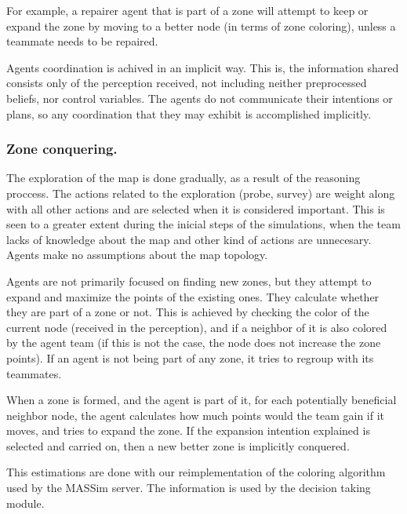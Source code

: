 \documentclass{llncs2e/llncs}
\begin{document}
    For example, a repairer agent that is part of a zone will attempt to keep or
    expand the zone by moving to a better node (in terms of zone coloring), 
    unless a teammate needs to be repaired.
    
    Agents coordination is achived in an implicit way. This is, the information
    shared consists only of the perception received, not including neither 
    preprocessed beliefs, nor control variables. The agents do not communicate
    their intentions or plans, so any coordination that they may exhibit is 
    accomplished implicitly.
       
\subsubsection{Zone conquering.}
    
    The exploration of the map is done gradually, as a result of the reasoning 
    proccess. The actions related to the exploration (probe, survey) are weight 
    along with all other actions and are selected when it is considered important. 
    This is seen to a greater extent during the inicial steps of the simulations, 
    when the team lacks of knowledge about the map and other kind of actions are 
    unnecesary. Agents make no assumptions about the map topology.

    Agents are not primarily focused on finding new zones, but they attempt to 
    expand and maximize the points of the existing ones.    
    They calculate whether they are part of a zone or not. This is achieved
    by checking the color of the current node (received in the perception), and if
    a neighbor of it is also colored by the agent team (if this is not the case, the 
    node does not increase the zone points).
    If an agent is not being part of any zone, it tries to regroup with its 
    teammates. 

    When a zone is formed, and the agent is part of it, for each potentially 
    beneficial neighbor node, the agent calculates how much points would the team 
    gain if it moves, and tries to expand the zone.
    If the expansion intention explained is selected and carried on, then a new 
    better zone is implicitly conquered.
    
    This estimations are done with our reimplementation of the coloring algorithm used 
    by the MASSim server. The information is used by the decision taking module.  
\end{document}
